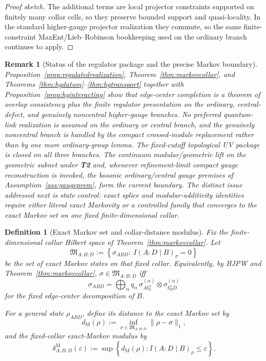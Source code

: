 \documentclass[11pt]{article}
\newtheorem{definition}[theorem]{Definition}
\newtheorem{remark}[theorem]{Remark}
\begin{document}
\begin{proof}[Proof sketch]
The additional terms are local projector constraints supported on finitely many collar cells, so they preserve bounded support and quasi-locality. In the standard higher-gauge projector realization they commute, so the same finite-constraint MaxEnt/Lieb--Robinson bookkeeping used on the ordinary branch continues to apply.
\end{proof}

\begin{remark}[Status of the regulator package and the precise Markov boundary]
Proposition~\ref{prop:regulatedrealization}, Theorem~\ref{thm:markovcollar}, and Theorems~\ref{thm:hgdatum}--\ref{thm:hgtransport} together with Proposition~\ref{prop:hginteracting} show that edge-center completion is a theorem of overlap consistency plus the finite regulator presentation on the ordinary, central-defect, and genuinely noncentral higher-gauge branches. No preferred quantum-link realization is assumed on the ordinary or central branch, and the genuinely noncentral branch is handled by the compact crossed-module replacement rather than by one more ordinary-group lemma. The fixed-cutoff topological UV package is closed on all three branches. The continuum modular/geometric lift on the geometric subnet under \textbf{T2} and, whenever refinement-limit compact gauge reconstruction is invoked, the bosonic ordinary/central gauge premises of Assumption~\ref{ass:gaugeprem}, form the current boundary. The distinct issue addressed next is \emph{state} control: exact splice and modular-additivity identities require either literal exact Markovity or a controlled family that converges to the exact Markov set on one fixed finite-dimensional collar.
\end{remark}

\begin{definition}[Exact Markov set and collar-distance modulus]\label{def:markovmodulus}
Fix the finite-dimensional collar Hilbert space of Theorem~\ref{thm:markovcollar}. Let
\[
\mathfrak M_{A:B:D}
:=
\left\{
\sigma_{ABD}:\ I(A:D\mid B)_\sigma=0
\right\}
\]
be the set of exact Markov states on that fixed collar. Equivalently, by HJPW and Theorem~\ref{thm:markovcollar}, \(\sigma\in\mathfrak M_{A:B:D}\) iff
\[
\sigma_{ABD}
=
\bigoplus_\alpha q_\alpha\,
\sigma^{(\alpha)}_{A b_L^\alpha}\otimes \sigma^{(\alpha)}_{b_R^\alpha D}
\]
for the fixed edge-center decomposition of \(B\).

For a general state \(\rho_{ABD}\), define its distance to the exact Markov set by
\[
d_{\mathrm M}(\rho):=\inf_{\sigma\in\mathfrak M_{A:B:D}}\|\rho-\sigma\|_1,
\]
and the fixed-collar exact-Markov modulus by
\[
\delta^{\mathrm M}_{A:B:D}(\varepsilon)
:=
\sup\left\{
d_{\mathrm M}(\rho):
I(A:D\mid B)_\rho\le \varepsilon
\right\}.
\]
\end{definition}
\end{document}
